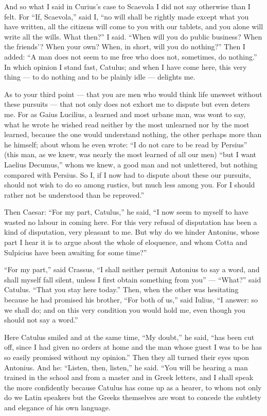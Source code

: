  And so what I said in Curius's case to Scaevola I did not say otherwise than I felt. For ``If, Scaevola,'' said I, ``no will shall be rightly made except what you have written, all the citizens will come to you with our tablets, and you alone will write all the wills. What then?'' I said. ``When will you do public business? When the friends'? When your own? When, in short, will you do nothing?'' Then I added: ``A man does not seem to me free who does not, sometimes, do nothing.'' In which opinion I stand fast, Catulus; and when I have come here, this very thing — to do nothing and to be plainly idle — delights me.

 As to your third point — that you are men who would think life unsweet without these pursuits — that not only does not exhort me to dispute but even deters me. For as Gaius Lucilius, a learned and most urbane man, was wont to say, what he wrote he wished read neither by the most unlearned nor by the most learned, because the one would understand nothing, the other perhaps more than he himself; about whom he even wrote: ``I do not care to be read by Persius'' (this man, as we knew, was nearly the most learned of all our men) ``but I want Laelius Decumus,'' whom we knew, a good man and not unlettered, but nothing compared with Persius. So I, if I now had to dispute about these our pursuits, should not wish to do so among rustics, but much less among you. For I should rather not be understood than be reproved.''

 Then Caesar: ``For my part, Catulus,'' he said, ``I now seem to myself to have wasted no labour in coming here. For this very refusal of disputation has been a kind of disputation, very pleasant to me. But why do we hinder Antonius, whose part I hear it is to argue about the whole of eloquence, and whom Cotta and Sulpicius have been awaiting for some time?''

 ``For my part,'' said Crassus, ``I shall neither permit Antonius to say a word, and shall myself fall silent, unless I first obtain something from you'' — ``What?'' said Catulus. ``That you stay here today.'' Then, when the other was hesitating because he had promised his brother, ``For both of us,'' said Iulius, ``I answer: so we shall do; and on this very condition you would hold me, even though you should not say a word.''

 Here Catulus smiled and at the same time, ``My doubt,'' he said, ``has been cut off, since I had given no orders at home and the man whose guest I was to be has so easily promised without my opinion.'' Then they all turned their eyes upon Antonius. And he: ``Listen, then, listen,'' he said. ``You will be hearing a man trained in the school and from a master and in Greek letters, and I shall speak the more confidently because Catulus has come up as a hearer, to whom not only do we Latin speakers but the Greeks themselves are wont to concede the subtlety and elegance of his own language.

